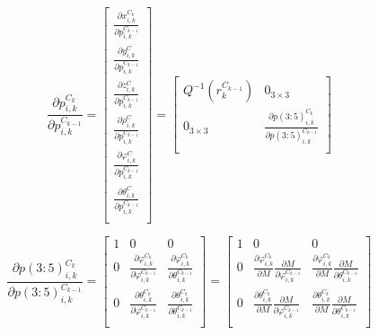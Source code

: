 \begin{equation}
\frac{\partial p_{i,k}^{C_{k }}}{\partial p_{i,k}^{C_{k-1 }}}=
\begin{bmatrix}
\frac{\partial x_{i,k}^{C_{k}}}{\partial p_{i,k}^{C_{k-1 }}} \\
\frac{\partial y_{i,k}^{C}}{\partial p_{i,k}^{C_{k-1 }}} \\
\frac{\partial z_{i,k}^{C}}{\partial p_{i,k}^{C_{k-1 }}} \\
\frac{\partial \rho _{i,k}^{C}}{\partial p_{i,k}^{C_{k-1 }}} \\
\frac{\partial \varphi _{i, k}^{C}}{\partial p_{i,k}^{C_{k-1 }}} \\
\frac{\partial \theta _{i, k}^{C}}{\partial p_{i,k}^{C_{k-1 }}} \\
\end{bmatrix}=\begin{bmatrix}
Q^{-1}(r_{k}^{C_{k-1}}) & 0_{3\times 3} \\
0_{3\times 3} & 
\frac{\partial p(3:5)_{i,k}^{C_{k}}}{\partial p(3:5)_{i,k}^{C_{k-1}}} \\
\end{bmatrix}
\end{equation}


\begin{equation}
\frac{\partial p(3:5)_{i,k}^{C_{k}}}{\partial p(3:5)_{i,k}^{C_{k-1}}}=
 \begin{bmatrix}
1 & 0 & 0 \\
0 & 
\frac{\partial \varphi_{i, k}^{C_{k}}}
{\partial \varphi_{i,k}^{C_{k-1}}} & 
\frac{\partial \varphi _{i, k}^{C_{k}}}
{\partial \theta _{i, k}^{C_{k-1}}} \\
0 & 
\frac{\partial \theta _{i, k}^{C_{k}}}
{\partial \varphi _{i, k}^{C_{k-1}}} & 
\frac{\partial \theta _{i, k}^{C_{k}}}
{\partial \theta _{i, k}^{C_{k-1}}} \\
\end{bmatrix}=\begin{bmatrix}
1 & 0 & 0 \\
0 & 
\frac{\partial \varphi _{i, k}^{C_{k}}}{\partial M}
\frac{\partial M}{\partial \varphi _{i, k}^{C_{k-1}}} & 
\frac{\partial \varphi _{i,k}^{C_{k}}}
{\partial M}\frac{\partial M}{\partial \theta _{i,k}^{C_{k-1}}}\\
0 & 
\frac{\partial \theta _{i, k}^{C_{k}}}{\partial M}
\frac{\partial M}{\partial \varphi _{i, k}^{C_{k-1}}} & 
\frac{\partial \theta _{i,k}^{C_{k}}}{\partial M}
\frac{\partial M}{\partial \theta _{i, k}^{C_{k-1}}} \\
\end{bmatrix}
\end{equation}

